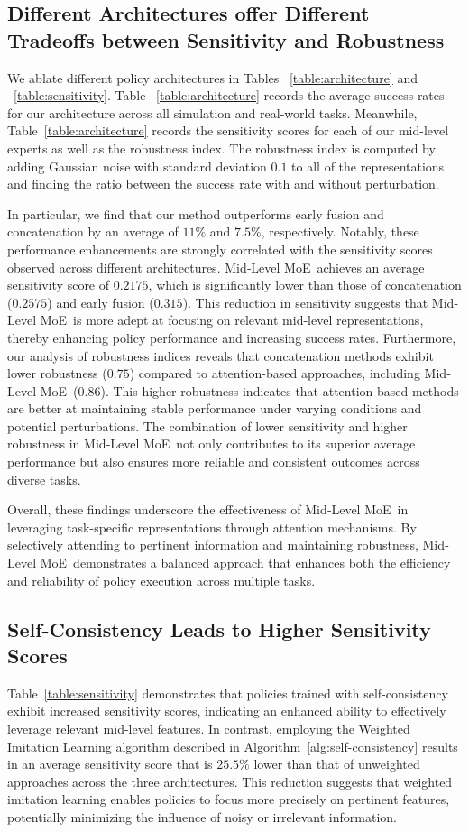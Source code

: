 \documentclass[conference,dvipsnames]{IEEEtran}
\newcommand{\MethodName}{Mid‐Level MoE}
\begin{document}
\subsection{Different Architectures offer Different Tradeoffs between Sensitivity and Robustness}
We ablate different policy architectures in Tables ~\ref{table:architecture} and ~\ref{table:sensitivity}. Table ~\ref{table:architecture} records the average success rates for our architecture across all simulation and real-world tasks. Meanwhile, Table~\ref{table:architecture} records the sensitivity scores for each of our mid-level experts as well as the robustness index. The robustness index is computed by adding Gaussian noise with standard deviation $0.1$ to all of the representations and finding the ratio between the success rate with and without perturbation.

In particular, we find that our method outperforms early fusion and concatenation by an average of $11\%$ and $7.5\%$, respectively. Notably, these performance enhancements are strongly correlated with the sensitivity scores observed across different architectures. \MethodName~achieves an average sensitivity score of $0.2175$, which is significantly lower than those of concatenation ($0.2575$) and early fusion ($0.315$). This reduction in sensitivity suggests that \MethodName~is more adept at focusing on relevant mid-level representations, thereby enhancing policy performance and increasing success rates. Furthermore, our analysis of robustness indices reveals that concatenation methods exhibit lower robustness ($0.75$) compared to attention-based approaches, including \MethodName~($0.86$). This higher robustness indicates that attention-based methods are better at maintaining stable performance under varying conditions and potential perturbations. The combination of lower sensitivity and higher robustness in \MethodName~not only contributes to its superior average performance but also ensures more reliable and consistent outcomes across diverse tasks.

Overall, these findings underscore the effectiveness of \MethodName~in leveraging task-specific representations through attention mechanisms. By selectively attending to pertinent information and maintaining robustness, \MethodName~demonstrates a balanced approach that enhances both the efficiency and reliability of policy execution across multiple tasks.

\subsection{Self-Consistency Leads to Higher Sensitivity Scores}
Table~\ref{table:sensitivity} demonstrates that policies trained with self-consistency exhibit increased sensitivity scores, indicating an enhanced ability to effectively leverage relevant mid-level features. In contrast, employing the Weighted Imitation Learning algorithm described in Algorithm~\ref{alg:self-consistency} results in an average sensitivity score that is $25.5\%$ lower than that of unweighted approaches across the three architectures. This reduction suggests that weighted imitation learning enables policies to focus more precisely on pertinent features, potentially minimizing the influence of noisy or irrelevant information.
\end{document}

